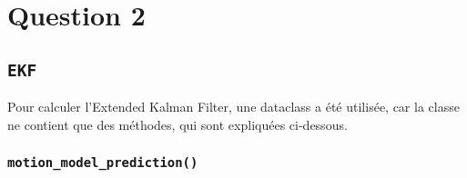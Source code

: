 \documentclass[../CSC_5RO12_TA_TP2.tex]{subfiles}
\begin{document}
\section{Question 2}
\subsection{\texttt{EKF}}
\noindent Pour calculer l'Extended Kalman Filter, une dataclass a été utilisée, car la classe ne contient que des méthodes, qui sont expliquées ci-dessous.

\subsubsection{\texttt{motion\_model\_prediction()}}
\end{document}
